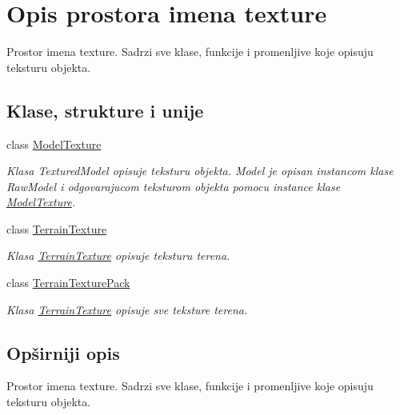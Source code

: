 \hypertarget{namespacetexture}{}\section{Opis prostora imena texture}
\label{namespacetexture}


Prostor imena texture. Sadrzi sve klase, funkcije i promenljive koje opisuju teksturu objekta.  


\subsection*{Klase, strukture i unije}
\begin{DoxyCompactItemize}
\item 
class \hyperlink{classtexture_1_1ModelTexture}{Model\+Texture}
\begin{DoxyCompactList}\small\item\em Klasa Textured\+Model opisuje teksturu objekta. Model je opisan instancom klase Raw\+Model i odgovarajucom teksturom objekta pomocu instance klase \hyperlink{classtexture_1_1ModelTexture}{Model\+Texture}. \end{DoxyCompactList}\item 
class \hyperlink{classtexture_1_1TerrainTexture}{Terrain\+Texture}
\begin{DoxyCompactList}\small\item\em Klasa \hyperlink{classtexture_1_1TerrainTexture}{Terrain\+Texture} opisuje teksturu terena. \end{DoxyCompactList}\item 
class \hyperlink{classtexture_1_1TerrainTexturePack}{Terrain\+Texture\+Pack}
\begin{DoxyCompactList}\small\item\em Klasa \hyperlink{classtexture_1_1TerrainTexture}{Terrain\+Texture} opisuje sve teksture terena. \end{DoxyCompactList}\end{DoxyCompactItemize}


\subsection{Opširniji opis}
Prostor imena texture. Sadrzi sve klase, funkcije i promenljive koje opisuju teksturu objekta. 